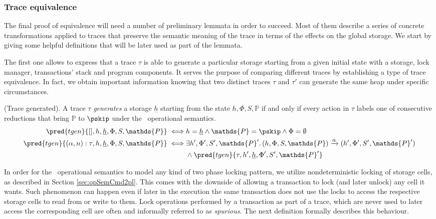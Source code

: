 \tocless\subsubsection{Trace equivalence}

The final proof of equivalence will need a number of preliminary lemmata in order to succeed. Most of them describe a series of concrete transformations applied to traces that preserve the semantic meaning of the trace in terms of the effects on the global storage. We start by giving some helpful definitions that will be later used as part of the lemmata.

The first one allows to express that a trace $\tau$ is able to generate a particular storage starting from a given initial state with a storage, lock manager, transactions' stack and program components. It serves the purpose of comparing different traces by establishing a type of trace equivalence. In fact, we obtain important information knowing that two distinct traces $\tau$ and $\tau'$ can generate the same heap under specific circumstances.

\begin{defn}
	(Trace generated).
	A trace $\tau$ \emph{generates} a storage $\underline{h}$ starting from the state $h, \Phi, S, \mathds{P}$ if and only if every action in $\tau$ labels one of consecutive reductions that bring $\mathds{P}$ to $\pskip$ under the \tpl\ operational semantics.
	\begin{align*}
		\pred{tgen}{[], h, \underline{h}, \Phi, S, \mathds{P}}
			\iff&
		h = \underline{h} \land \mathds{P} = \pskip \land \Phi = \emptyset
			\\
		\pred{tgen}{(\alpha, n) : \tau, h, \underline{h}, \Phi, S, \mathds{P}}
			\iff&
		\exists h', \Phi', S', \mathds{P}' \ldotp (h, \Phi, S, \mathds{P}) \xrightarrow{\alpha} (h', \Phi', S', \mathds{P}') \\ &\land \pred{tgen}{\tau, h', \underline{h}, \Phi', S', \mathds{P}'}
	\end{align*}
\end{defn}

In order for the \tpl\ operational semantics to model any kind of two phase locking pattern, we utilize nondeterministic locking of storage cells, as described in Section \ref{sec:opSemCmd2pl}. This comes with the downside of allowing a transaction to lock (and later unlock) any cell it wants. Such phenomenon can happen even if later in the execution the same transaction does not use the locks to access the respective storage cells to read from or write to them. Lock operations performed by a transaction as part of a trace, which are never used to later access the corresponding cell are often and informally referred to as \textit{spurious}. The next definition formally describes this behaviour.

